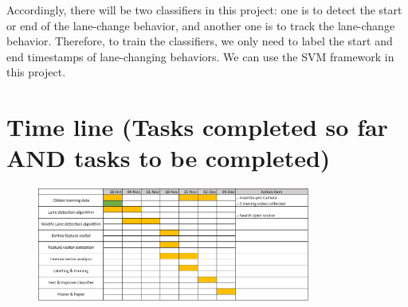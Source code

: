 \documentclass[letterpaper,11pt]{article}
\begin{document}
Accordingly, there will be two classifiers in this project: one is to detect the start or end of the lane-change behavior,  and another one is to track the lane-change behavior. Therefore, to train the classifiers, we only need to label the start and end timestamps of lane-changing behaviors. We can use the SVM framework in this project.

\section{Time line (Tasks completed so far AND tasks to be completed)}

\begin{figure}[!ht]
	\centering
	\includegraphics[width=0.8\textwidth]{./img/schedule.png}
\end{figure}
\end{document}
